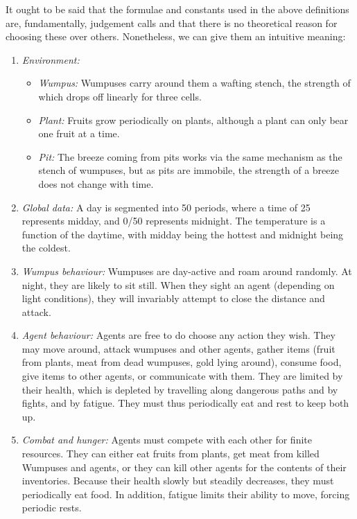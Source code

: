 It ought to be said that the formulae and constants used in the above definitions are, fundamentally, judgement calls and that there is no theoretical reason for choosing these over others. Nonetheless, we can give them an intuitive meaning:
\begin{enumerate}
	\item \emph{Environment:}\ 
	\begin{itemize}
		\item \emph{Wumpus:} Wumpuses carry around them a wafting stench, the strength of which drops off linearly for three cells.
		\item \emph{Plant:} Fruits grow periodically on plants, although a plant can only bear one fruit at a time.
		\item \emph{Pit:} The breeze coming from pits works via the same mechanism as the stench of wumpuses, but as pits are immobile, the strength of a breeze does not change with time.
	\end{itemize}
	\item \emph{Global data:} A day is segmented into 50 periods, where a time of 25 represents midday, and 0/50 represents midnight. The temperature is a function of the daytime, with midday being the hottest and midnight being the coldest.
	\item \emph{Wumpus behaviour:} Wumpuses are day-active and roam around randomly. At night, they are likely to sit still. When they sight an agent (depending on light conditions), they will invariably attempt to close the distance and attack.
	\item \emph{Agent behaviour:} Agents are free to do choose any action they wish. They may move around, attack wumpuses and other agents, gather items (fruit from plants, meat from dead wumpuses, gold lying around), consume food, give items to other agents, or communicate with them. They are limited by their health, which is depleted by travelling along dangerous paths and by fights, and by fatigue. They must thus periodically eat and rest to keep both up.
	\item \emph{Combat and hunger:} Agents must compete with each other for finite resources. They can either eat fruits from plants, get meat from killed Wumpuses and agents, or they can kill other agents for the contents of their inventories. Because their health slowly but steadily decreases, they must periodically eat food. In addition, fatigue limits their ability to move, forcing periodic rests.
\end{enumerate}

